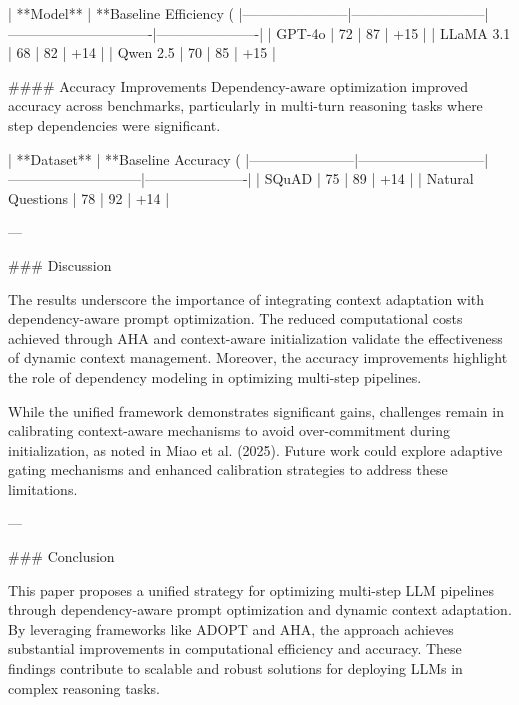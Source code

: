 | **Model**            | **Baseline Efficiency (%
|-----------------------|-----------------------------|-------------------------------|----------------------|
| GPT-4o               | 72                          | 87                            | +15                 |
| LLaMA 3.1            | 68                          | 82                            | +14                 |
| Qwen 2.5             | 70                          | 85                            | +15                 |

#### Accuracy Improvements
Dependency-aware optimization improved accuracy across benchmarks, particularly in multi-turn reasoning tasks where step dependencies were significant.

| **Dataset**          | **Baseline Accuracy (%
|-----------------------|---------------------------|-----------------------------|----------------------|
| SQuAD                | 75                        | 89                          | +14                 |
| Natural Questions    | 78                        | 92                          | +14                 |

---

### Discussion

The results underscore the importance of integrating context adaptation with dependency-aware prompt optimization. The reduced computational costs achieved through AHA and context-aware initialization validate the effectiveness of dynamic context management. Moreover, the accuracy improvements highlight the role of dependency modeling in optimizing multi-step pipelines.

While the unified framework demonstrates significant gains, challenges remain in calibrating context-aware mechanisms to avoid over-commitment during initialization, as noted in Miao et al. (2025). Future work could explore adaptive gating mechanisms and enhanced calibration strategies to address these limitations.

---

### Conclusion

This paper proposes a unified strategy for optimizing multi-step LLM pipelines through dependency-aware prompt optimization and dynamic context adaptation. By leveraging frameworks like ADOPT and AHA, the approach achieves substantial improvements in computational efficiency and accuracy. These findings contribute to scalable and robust solutions for deploying LLMs in complex reasoning tasks.

